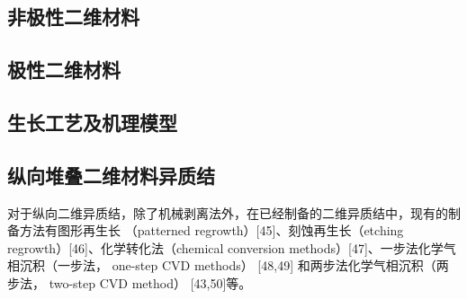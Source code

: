 


\subsection{非极性二维材料}

\subsection{极性二维材料}
\subsection{生长工艺及机理模型}

\subsection{纵向堆叠二维材料异质结}
对于纵向二维异质结，除了机械剥离法外，在已经制备的二维异质结中，现有的制备方法有图形再生长
（patterned regrowth）[45]、刻蚀再生长（etching regrowth）[46]、化学转化法（chemical 
conversion methods）[47]、一步法化学气相沉积（一步法， one-step CVD methods） [48,49]
和两步法化学气相沉积（两步法， two-step CVD method） [43,50]等。

